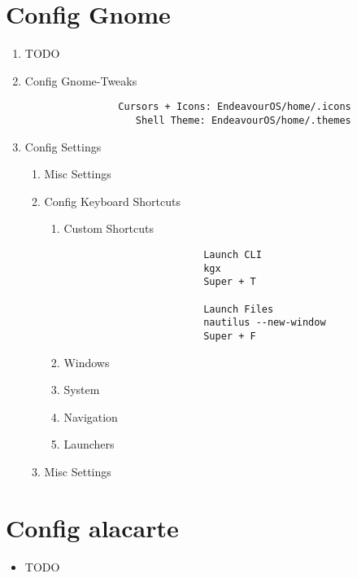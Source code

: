 \documentclass[12pt]{article}
\begin{document}
    \section{Config Gnome}\label{sec:config-gnome}
        \begin{enumerate}
            \item TODO
            \item Config Gnome-Tweaks
            \begin{verbatim}
                Cursors + Icons: EndeavourOS/home/.icons
                   Shell Theme: EndeavourOS/home/.themes
            \end{verbatim}
            \item Config Settings
            \begin{enumerate}
                \item Misc Settings
                \item Config Keyboard Shortcuts
                \begin{enumerate}
                    \item Custom Shortcuts
                    \begin{verbatim}
                        Launch CLI
                        kgx
                        Super + T

                        Launch Files
                        nautilus --new-window
                        Super + F
                    \end{verbatim}
                    \item Windows
                    \item System
                    \item Navigation
                    \item Launchers
                \end{enumerate}
                \item Misc Settings
            \end{enumerate}
        \end{enumerate}

    \section{Config alacarte}\label{sec:config-alacarte}
        \begin{itemize}
            \item TODO
        \end{itemize}
\end{document}
